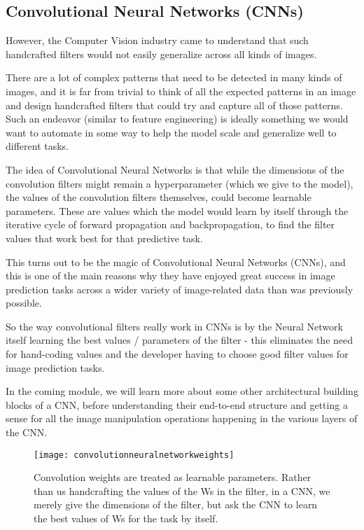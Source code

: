 	\subsection{Convolutional Neural Networks (CNNs)}
	\begin{bulletedlist}
		\item However, the Computer Vision industry came to understand that such handcrafted filters would not easily generalize across all kinds of images.
		\item There are a lot of complex patterns that need to be detected in many kinds of images, and it is far from trivial to think of all the expected patterns in an image and design handcrafted filters that could try and capture all of those patterns. Such an endeavor (similar to feature engineering) is ideally something we would want to automate in some way to help the model scale and generalize well to different tasks.
		\item The idea of Convolutional Neural Networks is that while the dimensions of the convolution filters might remain a hyperparameter (which we give to the model), the values of the convolution filters themselves, could become learnable parameters. These are values which the model would learn by itself through the iterative cycle of forward propagation and backpropagation, to find the filter values that work best for that predictive task.
		\item This turns out to be the magic of Convolutional Neural Networks (CNNs), and this is one of the main reasons why they have enjoyed great success in image prediction tasks across a wider variety of image-related data than was previously possible.
		\item So the way convolutional filters really work in CNNs is by the Neural Network itself learning the best values / parameters of the filter - this eliminates the need for hand-coding values and the developer having to choose good filter values for image prediction tasks.
		\item In the coming module, we will learn more about some other architectural building blocks of a CNN, before understanding their end-to-end structure and getting a sense for all the image manipulation operations happening in the various layers of the CNN.
	\end{bulletedlist}

	\begin{figure}[htb]
		\centering
		\texttt{[image: convolutionneuralnetworkweights]}
		\caption[Convolution weights are treated as learnable parameters]{Convolution weights are treated as learnable parameters.  Rather than us handcrafting the values of the Ws in the filter, in a CNN, we merely give the dimensions of the filter, but ask the CNN to learn the best values of Ws for the task by itself.}
		\label{fig:convolutionneuralnetworkweights}
	\end{figure}


